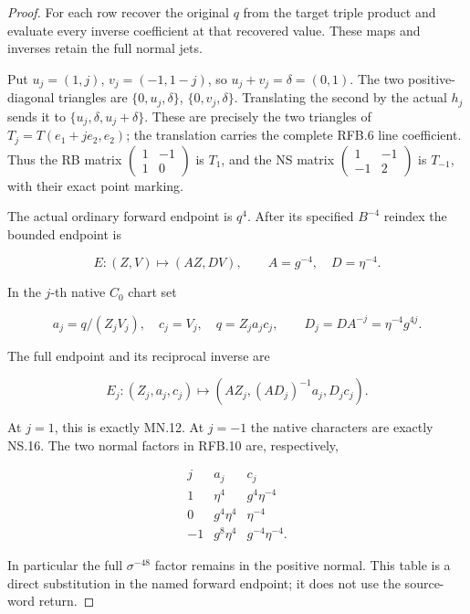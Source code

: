 \begin{proof}
For each row recover the original \(q\) from the target triple
product and evaluate every inverse coefficient at that recovered
value. These maps and inverses retain the full normal jets.

Put \(u_j=(1,j)\), \(v_j=(-1,1-j)\), so \(u_j+v_j=\delta=(0,1)\).
The two positive-diagonal triangles are
\(\{0,u_j,\delta\}\), \(\{0,v_j,\delta\}\).
Translating the second by the actual \(h_j\) sends it to
\(\{u_j,\delta,u_j+\delta\}\). These are precisely the two
triangles of \(T_j=T(e_1+je_2,e_2)\); the translation carries the
complete RFB.6 line coefficient. Thus the RB matrix
\(\left(\begin{smallmatrix}1&-1\\1&0\end{smallmatrix}\right)\)
is \(T_1\), and the NS matrix
\(\left(\begin{smallmatrix}1&-1\\-1&2\end{smallmatrix}\right)\)
is \(T_{-1}\), with their exact point marking.

The actual ordinary forward endpoint is \(q^4\). After its specified
\(B^{-4}\) reindex the bounded endpoint is

\[
 E:(Z,V)\mapsto(AZ,DV),\qquad A=g^{-4},\quad D=\eta^{-4}.
 \tag{RFB.8}
\]

In the \(j\)-th native \(C_0\) chart set

\[
 a_j=q/(Z_jV_j),\quad c_j=V_j,\quad q=Z_ja_jc_j,\qquad
 D_j=D A^{-j}=\eta^{-4}g^{4j}.
 \tag{RFB.9}
\]

The full endpoint and its reciprocal inverse are

\[
 E_j:(Z_j,a_j,c_j)\mapsto
       (AZ_j,(AD_j)^{-1}a_j,D_jc_j).
 \tag{RFB.10}
\]

At \(j=1\), this is exactly MN.12. At \(j=-1\) the native
characters are exactly NS.16. The two normal factors in RFB.10
are, respectively,

\[
\begin{array}{c|cc}
j&a_j&c_j\\\hline
1&\eta^4&g^4\eta^{-4}\\
0&g^4\eta^4&\eta^{-4}\\
-1&g^8\eta^4&g^{-4}\eta^{-4}.
\end{array}
 \tag{RFB.11}
\]

In particular the full \(\sigma^{-48}\) factor remains in the
positive normal. This table is a direct substitution in the named
forward endpoint; it does not use the source-word return.


\end{proof}
